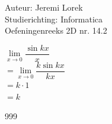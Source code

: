 \documentclass[a4paper]{article}
\begin{document}
  
\noindent \large Auteur: Jeremi Lorek\\
\noindent \large Studierichting: Informatica\\
\noindent \large Oefeningenreeks 2D nr. 14.2\\

\medskip
\normalsize

$\lim\limits_{x \to 0} \dfrac{\sin kx}{x}$ \\

$= \lim\limits_{x \to 0} \dfrac{k \sin kx}{k x} $\\

$= k \cdot 1$ \\

$= k$  \\

\begin{thebibliography}{999}
\end{thebibliography}
\end{document}
